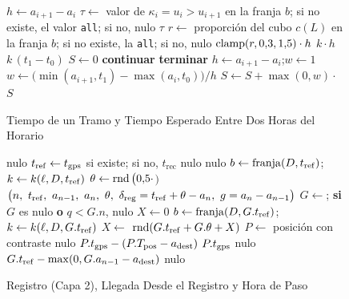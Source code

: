 \begin{figure}[ht]
\caption{Tiempo de un Tramo y Tiempo Esperado Entre Dos Horas del Horario}\label{alg:esperado}
\begin{algorithmic}[1]
  \State $h\gets a_{i+1}-a_i$
  \State $\tau\gets$ valor de $\kappa_i=u_i{>}u_{i+1}$ en la franja $b$; si no existe, el valor \texttt{all}; si no, nulo
   \Return $\tau$ \EndIf
    \State $r\gets$ proporción del cubo $c(L)$ en la franja $b$; si no existe, la \texttt{all}; si no, nulo
     \Return $\operatorname{clamp}(r,0{,}3,1{,}5)\cdot h$ \EndIf
  \EndIf
  \State \Return $k\cdot h$
\EndFunction
\Statex
{}
   \Return $k\,(t_1-t_0)$ \EndIf
  \State $S\gets0$
     \textbf{continuar} \EndIf
     \textbf{terminar} \EndIf
    \State $h\gets a_{i+1}-a_i$;\quad $w\gets1$
     $w\gets\big(\min(a_{i+1},t_1)-\max(a_i,t_0)\big)/h$ \EndIf
    \State $S\gets S+\max(0,w)\cdot$
  \EndFor
  \State \Return $S$
\EndFunction
\end{algorithmic}
\end{figure}

\begin{figure}[ht]
\caption{Registro (Capa 2), Llegada Desde el Registro y Hora de Paso}\label{alg:registro}
\begin{algorithmic}[1]
   \Return nulo \EndIf
  \State $t_{\mathrm{ref}}\gets t_{\mathrm{gps}}$ si existe; si no, $t_{\mathrm{rec}}$
   \Return nulo \EndIf
   \Return nulo \EndIf
  \State $b\gets\operatorname{franja}(D,t_{\mathrm{ref}})$;\ $k\gets k(\ell,D,t_{\mathrm{ref}})$
  \State $\theta\gets\operatorname{rnd}\big(0{,}5\cdot$$\big)$
  \State \Return $\big(n,\ \tref,\ a_{n-1},\ a_n,\ \theta,\ \delta_{\mathrm{reg}}=\tref+\theta-a_n,\ g=a_n-a_{n-1}\big)$
\EndFunction
\Statex
{}
  \State $G\gets$; \textbf{si} $G$ es nulo \textbf{o} $q<G.n$, \Return nulo
  \State $X\gets0$
    \State $b\gets\operatorname{franja}(D,G.t_{\mathrm{ref}})$;\ $k\gets k(\ell,D,G.t_{\mathrm{ref}})$
    \State $X\gets$
  \EndIf
  \State \Return $\operatorname{rnd}(G.t_{\mathrm{ref}}+G.\theta+X)$
\EndFunction
\Statex
{}
  \State $P\gets$ posición con contraste
     \Return nulo \EndIf
      \State \Return $P.t_{\mathrm{gps}}-(P.T_{\mathrm{pos}}-a_{\mathrm{dest}})$
    \EndIf
     \Return $P.t_{\mathrm{gps}}$ \EndIf
    \State \Return nulo
  \EndIf
   \Return $G.t_{\mathrm{ref}}-\max(0,G.a_{n-1}-a_{\mathrm{dest}})$ \EndIf
  \State \Return nulo
\EndFunction
\end{algorithmic}
\end{figure}

